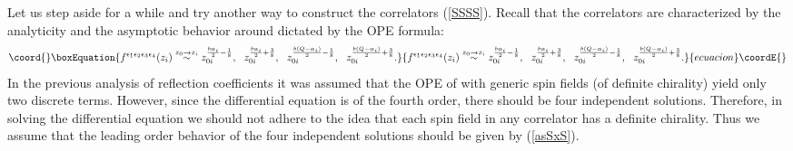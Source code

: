\documentclass[a4paper,12pt]{article}
\providecommand{\ep}{{\epsilon}}
\providecommand{\bep}{{\bar{\epsilon}}}
\begin{document}
   Let us step aside for a while and try another way to
 construct the correlators (\ref{SSSS}).
 Recall that the correlators are characterized by the analyticity
 and the asymptotic behavior around \coordHE{} dictated
 by the OPE formula:
\begin{equation}\coord{}\boxEquation{
  f^{\ep_1\ep_2\ep_3\ep_4}(z_i) \stackrel{z_0\rightarrow z_i}{\sim}
  z_{0i}^{\frac{b\alpha_i}{2}-\frac{1}{8}},~~
  z_{0i}^{\frac{b\alpha_i}{2}+\frac{3}{8}},~~
  z_{0i}^{\frac{b(Q-\alpha_i)}{2}-\frac{1}{8}},~~
  z_{0i}^{\frac{b(Q-\alpha_i)}{2}+\frac{3}{8}}.
\label{asSxS}
}{
  f^{\ep_1\ep_2\ep_3\ep_4}(z_i) \stackrel{z_0\rightarrow z_i}{\sim}
  z_{0i}^{\frac{b\alpha_i}{2}-\frac{1}{8}},~~
  z_{0i}^{\frac{b\alpha_i}{2}+\frac{3}{8}},~~
  z_{0i}^{\frac{b(Q-\alpha_i)}{2}-\frac{1}{8}},~~
  z_{0i}^{\frac{b(Q-\alpha_i)}{2}+\frac{3}{8}}.
}{ecuacion}\coordE{}\end{equation}
 In the previous analysis of reflection coefficients it was assumed
 that the OPE of \myHighlight{$\Theta_{-b/2}^{\ep\bep}$}\coordHE{} with generic spin fields
 (of definite chirality) yield only two discrete terms.
 However, since the differential equation is of the fourth order,
 there should be four independent solutions.
 Therefore, in solving the differential equation
 we should not adhere to the idea that each spin field
 in any correlator has a definite chirality.
 Thus we assume that the leading order behavior of the four independent
 solutions should be given by (\ref{asSxS}).
\end{document}
